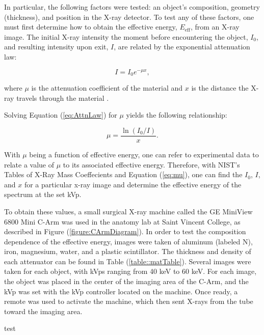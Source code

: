 In particular, the following factors were tested: an object's composition, geometry (thickness), and position in the X-ray detector. To test any of these factors, one must first determine how to obtain the effective energy, $E_{\text{eff}}$, from an X-ray image. The initial X-ray intensity the moment before encountering the object, $I_0$, and resulting intensity upon exit, $I$, are related by the exponential attenuation law:

\begin{equation}
    I = I_0e^{-\mu x},
\label{eq:AttnLaw}
\end{equation}

\noindent where $\mu$ is the attenuation coefficient of the material and $x$ is the distance the X-ray travels through the material \cite{AttnCoef}.

Solving Equation (\ref{eq:AttnLaw}) for $\mu$ yields the following relationship:

\begin{equation}
    \mu = \frac{\ln{(I_0/I)}}{x}.
\label{eq:mu}
\end{equation}

With $\mu$ being a function of effective energy, one can refer to experimental data to relate a value of $\mu$ to its associated effective energy. Therefore, with NIST's Tables of X-Ray Mass Coeffecients \cite{AttnCoef} and Equation (\ref{eq:mu}), one can find the $I_0$, $I$, and $x$ for a particular x-ray image and determine the effective energy of the spectrum at the set kVp.

To obtain these values, a small surgical X-ray machine called the GE MiniView 6800 Mini C-Arm was used in the anatomy lab at Saint Vincent College, as described in Figure (\ref{figure:CArmDiagram}). In order to test the composition dependence of the effective energy, images were taken of aluminum (labeled N), iron, magnesium, water, and a plastic scintillator. The thickness and density of each attenuator can be found in Table (\ref{table::matTable}).  Several images were taken for each object, with kVps ranging from 40 keV to 60 keV. For each image, the object was placed in the center of the imaging area of the C-Arm, and the kVp was set with the kVp controller located on the machine. Once ready, a remote was used to activate the machine, which then sent X-rays from the tube toward the imaging area.

\begin{table}[H]
	\centering
    
    \caption{test}
    \label{table::matTable}
\end{table}


